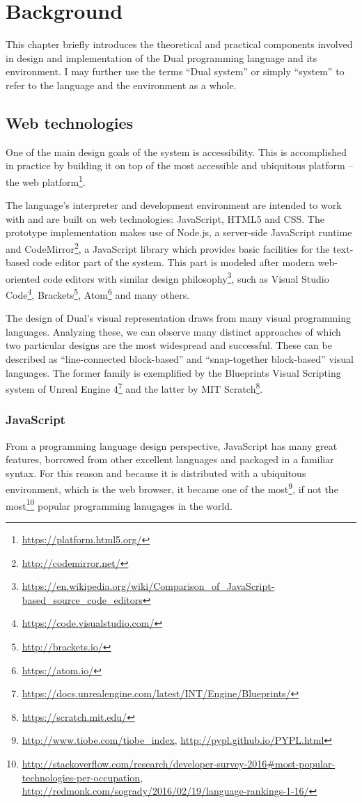 \chapter{Background}\label{chap:background}
This chapter briefly introduces the theoretical and practical components involved in design and implementation of the Dual programming language and its environment. I may further use the terms ``Dual system'' or simply ``system'' to refer to the language and the environment as a whole.

\section{Web technologies}
One of the main design goals of the system is accessibility. This is accomplished in practice by building it on top of the most accessible and ubiquitous platform -- the web platform\footnote{\url{https://platform.html5.org/}}.

The language's interpreter and development environment are intended to work with and are built on web technologies: JavaScript, HTML5 and CSS. The prototype implementation makes use of Node.js, a server-side JavaScript runtime and CodeMirror\footnote{\url{http://codemirror.net/}}, a JavaScript library which provides basic facilities for the text-based code editor part of the system. This part is modeled after modern web-oriented code editors with similar design philosophy\footnote{\url{https://en.wikipedia.org/wiki/Comparison_of_JavaScript-based_source_code_editors}}, such as Visual Studio Code\footnote{\url{https://code.visualstudio.com/}}, Brackets\footnote{\url{http://brackets.io/}}, Atom\footnote{\url{https://atom.io/}} and many others.

The design of Dual's visual representation draws from many visual programming languages. Analyzing these, we can observe many distinct approaches of which two particular designs are the most widespread and successful. These can be described as ``line-connected block-based'' and ``snap-together block-based'' visual languages. The former family is exemplified by the Blueprints Visual Scripting system of Unreal Engine 4\footnote{\url{https://docs.unrealengine.com/latest/INT/Engine/Blueprints/}} and the latter by MIT Scratch\footnote{\url{https://scratch.mit.edu/}}.

\subsection{JavaScript}
From a programming language design perspective, JavaScript has many great features, borrowed from other excellent languages and packaged in a familiar syntax. For this reason and because it is distributed with a ubiquitous environment, which is the web browser, it became one of the most\footnote{\url{http://www.tiobe.com/tiobe_index}, \url{http://pypl.github.io/PYPL.html}}, if not the most\footnote{\url{http://stackoverflow.com/research/developer-survey-2016\#most-popular-technologies-per-occupation}, \url{http://redmonk.com/sogrady/2016/02/19/language-rankings-1-16/}} popular programming lanugages in the world.

